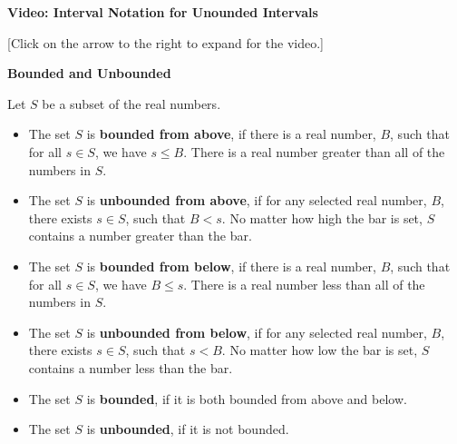 \documentclass{ximera}
\begin{document}
\begin{explanation} \textbf{Video: Interval Notation for Unounded Intervals}

[Click on the arrow to the right to expand for the video.]
\begin{expandable} 

\begin{center}
\end{center}

\end{expandable}
\end{explanation}










\begin{definition} \item \textbf{\textcolor{green!50!black}{Bounded and Unbounded}}

Let $S$ be a subset of the real numbers. \\


\begin{itemize}
\item The set $S$ is \textbf{bounded from above}, if there is a real number, $B$, such that for all $s \in S$, we have $s \leq B$.  There is a real number greater than all of the numbers in $S$.  \\

\item The set $S$ is \textbf{unbounded from above}, if for any selected real number, $B$, there exists $s \in S$, such that $B < s$. No matter how high the bar is set, $S$ contains a number greater than the bar.  \\

\item The set $S$ is \textbf{bounded from below}, if there is a real number, $B$, such that for all $s \in S$, we have $B \leq s$.  There is a real number less than all of the numbers in $S$.  \\

\item The set $S$ is \textbf{unbounded from below}, if for any selected real number, $B$, there exists $s \in S$, such that $s < B$. No matter how low the bar is set, $S$ contains a number less than the bar.  \\

\item The set $S$ is \textbf{bounded}, if it is both bounded from above and below.  

\item The set $S$ is \textbf{unbounded}, if it is not bounded.  \\
\end{itemize}


\end{definition}
\end{document}
